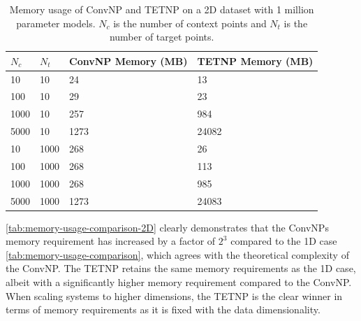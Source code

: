 \documentclass[../../main.tex]{subfiles}
\begin{document}
\begin{table}[H]
    \centering
    \begin{tabular}{@{}llll@{}}
    \toprule
    $N_c$ & $N_t$ & ConvNP Memory (MB) & TETNP Memory (MB) \\ \midrule
    10    & 10    & 24                 & 13                \\
    100   & 10    & 29                 & 23                \\
    1000  & 10    & 257                & 984               \\
    5000  & 10    & 1273               & 24082             \\ \midrule
    10    & 1000  & 268                & 26                \\
    100   & 1000  & 268                & 113               \\
    1000  & 1000  & 268                & 985               \\
    5000  & 1000  & 1273               & 24083             \\ \bottomrule
    \end{tabular}
    \caption{Memory usage of ConvNP and TETNP on a 2D dataset with 1 million parameter models. $N_c$ is the number of context points and $N_t$ is the number of target points.}
    \label{tab:memory-usage-comparison-2D}
    \end{table}
\FloatBarrier

\autoref{tab:memory-usage-comparison-2D} clearly demonstrates that the ConvNPs memory requirement has increased by a factor of $2^3$ compared to the 1D case \autoref{tab:memory-usage-comparison}, which agrees with the theoretical complexity of the ConvNP. The TETNP retains the same memory requirements as the 1D case, albeit with a significantly higher memory requirement compared to the ConvNP. When scaling systems to higher dimensions, the TETNP is the clear winner in terms of memory requirements as it is fixed with the data dimensionality.



\ifSubfilesClassLoaded{%
    \printbibliography{}
}{} 
\end{document}
